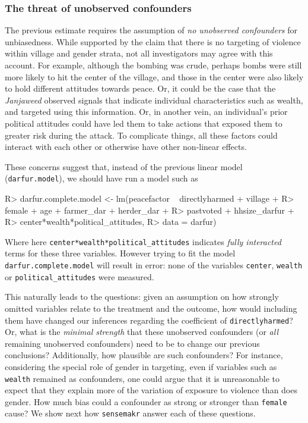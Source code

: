 \documentclass[
]{jss}
\begin{document}
\hypertarget{the-threat-of-unobserved-confounders}{%
\subsubsection{The threat of unobserved
confounders}\label{the-threat-of-unobserved-confounders}}

The previous estimate requires the assumption of \emph{no unobserved
confounders} for unbiasedness. While supported by the claim that there
is no targeting of violence within village and gender strata, not all
investigators may agree with this account. For example, although the
bombing was crude, perhaps bombs were still more likely to hit the
center of the village, and those in the center were also likely to hold
different attitudes towards peace. Or, it could be the case that the
\emph{Janjaweed} observed signals that indicate individual
characteristics such as wealth, and targeted using this information. Or,
in another vein, an individual's prior political attitudes could have
led them to take actions that exposed them to greater risk during the
attack. To complicate things, all these factors could interact with each
other or otherwise have other non-linear effects.

These concerns suggest that, instead of the previous linear model
(\texttt{darfur.model}), we should have run a model such as

\begin{CodeChunk}

\begin{CodeInput}
R> darfur.complete.model <- lm(peacefactor ~ directlyharmed  + village +  
R>                               female + age + farmer_dar + herder_dar + 
R>                               pastvoted + hhsize_darfur +
R>                               center*wealth*political_attitudes, 
R>                             data = darfur)
\end{CodeInput}
\end{CodeChunk}

\noindent Where here \texttt{center*wealth*political\_attitudes}
indicates \emph{fully interacted} terms for these three variables.
However trying to fit the model \texttt{darfur.complete.model} will
result in error: none of the variables \texttt{center}, \texttt{wealth}
or \texttt{political\_attitudes} were measured.

This naturally leads to the questions: given an assumption on how
strongly omitted variables relate to the treatment and the outcome, how
would including them have changed our inferences regarding the
coefficient of \texttt{directlyharmed}? Or, what is the \emph{minimal
strength} that these unobserved confounders (or \emph{all} remaining
unobserved confounders) need to be to change our previous conclusions?
Additionally, how plausible are such confounders? For instance,
considering the special role of gender in targeting, even if variables
such as \texttt{wealth} remained as confounders, one could argue that it
is unreasonable to expect that they explain more of the variation of
exposure to violence than does gender. How much bias could a confounder
as strong or stronger than \texttt{female} cause? We show next how
\texttt{sensemakr} answer each of these questions.
\end{document}
